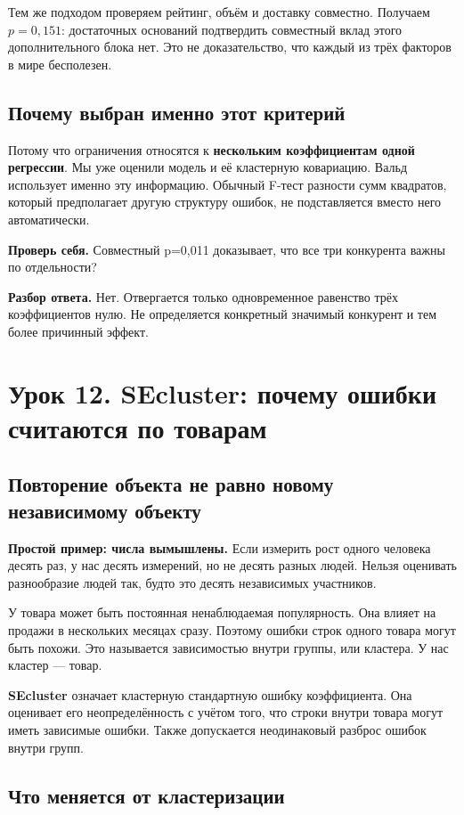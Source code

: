 \documentclass[12pt,a4paper]{article}
\newcommand{\toy}[1]{\par\textbf{Простой пример: числа вымышлены.} #1\par}
\newcommand{\check}[2]{\par\textbf{Проверь себя.} #1\par\textbf{Разбор ответа.} #2\par}
\begin{document}
Тем же подходом проверяем рейтинг, объём и доставку совместно. Получаем $p=0{,}151$: достаточных оснований подтвердить совместный вклад этого дополнительного блока нет. Это не доказательство, что каждый из трёх факторов в мире бесполезен.

\subsection{Почему выбран именно этот критерий}

Потому что ограничения относятся к \textbf{нескольким коэффициентам одной регрессии}. Мы уже оценили модель и её кластерную ковариацию. Вальд использует именно эту информацию. Обычный F-тест разности сумм квадратов, который предполагает другую структуру ошибок, не подставляется вместо него автоматически.

\check{Совместный p=0,011 доказывает, что все три конкурента важны по отдельности?}{Нет. Отвергается только одновременное равенство трёх коэффициентов нулю. Не определяется конкретный значимый конкурент и тем более причинный эффект.}

\section{Урок 12. SEcluster: почему ошибки считаются по товарам}

\subsection{Повторение объекта не равно новому независимому объекту}

\toy{Если измерить рост одного человека десять раз, у нас десять измерений, но не десять разных людей. Нельзя оценивать разнообразие людей так, будто это десять независимых участников.}

У товара может быть постоянная ненаблюдаемая популярность. Она влияет на продажи в нескольких месяцах сразу. Поэтому ошибки строк одного товара могут быть похожи. Это называется зависимостью внутри группы, или кластера. У нас кластер --- товар.

\textbf{SEcluster} означает кластерную стандартную ошибку коэффициента. Она оценивает его неопределённость с учётом того, что строки внутри товара могут иметь зависимые ошибки. Также допускается неодинаковый разброс ошибок внутри групп.

\subsection{Что меняется от кластеризации}
\end{document}
